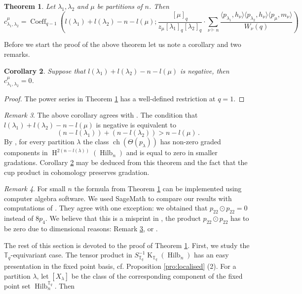\documentclass[12pt,a4paper]{amsart}
\theoremstyle{plain}
\newtheorem{tw}{Theorem}[section]
\newtheorem{cor}[tw]{Corollary}
\theoremstyle{definition}
\theoremstyle{remark}
\newtheorem{rem}[tw]{Remark}
\newcommand{\Hilb}[1]{\operatorname{Hilb}_{{#1}}}
\newcommand{\ch}{\operatorname{ch}}
\newcommand{\Tq}{{\mathbb{T}_q}}
\newcommand{\Partq}[1]{[{#1}]_q}
\newcommand{\coh}{\operatorname{H}}
\DeclareMathOperator{\KTh}{K}
\begin{document}
\begin{tw} \label{tw:main2}
	Let $\lambda_1,\lambda_2$ and $\mu$ be partitions of $n$. Then
	$$ c^\mu_{\lambda_1,\lambda_2}=\operatorname{Coeff}_{q-1}
	\left(
	{l(\lambda_1)+l(\lambda_2)-n-l(\mu);
	\frac{\Partq{\mu}}
	{z_\mu\Partq{\lambda_1}\Partq{\lambda_2}}\cdot\sum_{\nu\vdash n} \frac{\langle p_{\lambda_1},h_\nu\rangle\langle p_{\lambda_2},h_\nu\rangle\langle p_\mu,m_\nu\rangle}{W_\nu(q)} 
	}
	\right)
	$$
\end{tw}
Before we start the proof of the above theorem let us note a corollary and two remarks.
\begin{cor} \label{cor:coh}
	Suppose that $l(\lambda_1)+l(\lambda_2)-n-l(\mu)$ is negative, then $c^\mu_{\lambda_1,\lambda_2}=0$.
\end{cor}
\begin{proof}
	The power series in Theorem \ref{tw:main2} has a well-defined restriction at $q=1$.
\end{proof}
\begin{rem} \label{rem:odot_dim}
	The above corollary agrees with \cite[Theorem 1.1]{Boissiere2}. The condition that $l(\lambda_1)+l(\lambda_2)-n-l(\mu)$ is negative is equivalent to
	$$(n-l(\lambda_1))+(n-l(\lambda_2))>n-l(\mu)\,.$$
	By \cite[Theorem 1.1]{Boissiere2}, for every partition $\lambda$ the class $\ch(\Theta(p_\lambda))$ has non-zero graded components in $\coh^{2(n-l(\lambda))}(\Hilb{n})$ and is equal to zero in smaller gradations. Corollary \ref{cor:coh} may be deduced from this theorem and the fact that the cup product in cohomology preserves gradation.
\end{rem}
\begin{rem}
	 For small $n$ the formula from Theorem \ref{tw:main2} can be implemented using computer algebra software. We used SageMath to compare our results with computations of \cite[Section 9]{Boissiere}. They agree with one exception: we obtained that $p_{22}\odot p_{22}=0$ instead of $8p_4$. We believe that this is a misprint in \cite{Boissiere}, the product $p_{22}\odot p_{22}$ has to be zero due to dimensional reasons: Remark \ref{rem:odot_dim}, or \cite[second dot in Section 8.1]{Boissiere}.
\end{rem}
The rest of this section is devoted to the proof of Theorem \ref{tw:main2}. First, we study the $\Tq$-equivariant case. The tensor product in $S^{-1}_\Tq\KTh_{\Tq}(\Hilb{n})$ has an easy presentation in the fixed point basis, cf. Proposition \ref{pro:localised} (2). For a partition $\lambda$, let $[X_\lambda]$ be the class of the corresponding component of the fixed point set $\Hilb{n}^\Tq$. Then
\end{document}
